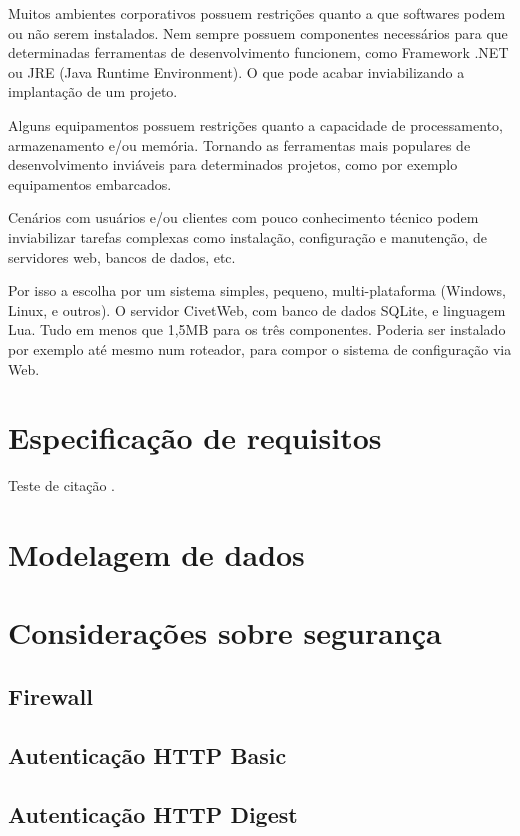 Muitos ambientes corporativos possuem restrições quanto a que softwares podem ou não serem instalados. Nem sempre possuem componentes necessários para que determinadas ferramentas de desenvolvimento funcionem, como Framework .NET ou JRE (Java Runtime Environment). O que pode acabar inviabilizando a implantação de um projeto.

Alguns equipamentos possuem restrições quanto a capacidade de processamento, armazenamento e/ou memória. Tornando as ferramentas mais populares de desenvolvimento inviáveis para determinados projetos, como por exemplo equipamentos embarcados.

Cenários com usuários e/ou clientes com pouco conhecimento técnico podem inviabilizar tarefas complexas como instalação, configuração e manutenção, de servidores web, bancos de dados, etc.

Por isso a escolha por um sistema simples, pequeno, multi-plataforma (Windows, Linux, e outros). O servidor CivetWeb, com banco de dados SQLite, e linguagem Lua. Tudo em menos que 1,5MB para os três componentes. Poderia ser instalado por exemplo até mesmo num roteador, para compor o sistema de configuração via Web.

\chapter{Especificação de requisitos}

Teste de citação \cite{cnet-google-crowdsourcing}.

\chapter{Modelagem de dados}

\chapter{Considerações sobre segurança}

\section{Firewall}

\section{Autenticação HTTP Basic}

\section{Autenticação HTTP Digest}

